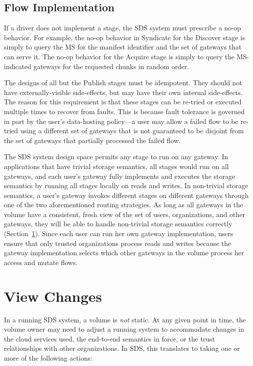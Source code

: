 \subsection{Flow Implementation}

If a driver does not implement a stage, the SDS system must prescribe a
no-op behavior.  For example, the no-op behavior in Syndicate for the
Discover stage is simply to query the MS for the manifest identifier and the 
set of gateways that can serve it.  The no-op behavior for the Acquire
stage is simply to query the MS-indicated gateways for the requested chunks
in random order.

The designs of all but the Publish stages must be
idempotent.  They should not have externally-visible side-effects, but may have
their own internal side-effects.  The reason
for this requirement is that these stages can be re-tried or executed
multiple times to recover from faults.  This is because fault tolerance is
governed in part by the user's data-hosting policy---a user may
allow a failed flow to be re-tried using a different set of gateways that is not
guaranteed to be disjoint from the set of gateways that partially processed
the failed flow.

The SDS system design space permits any stage to run on any gateway.  In
applications that have trivial storage semantics, all stages would run on all
gateways, and each user's gateway fully implements and executes the storage semantics
by running all stages locally on reads and writes.
In non-trivial storage semantics, a user's gateway invokes different stages on
different gateways through one of the two aforementioned routing strategies.
As long as all gateways in the volume have a consistent, fresh view of the set
of users, organizations, and other gateways, they will be able to handle
non-trivial storage semantics correctly (Section~\ref{sec:view-changes}).
Since each user can run her own gateway implementation, users ensure that
only trusted organizations process reads and writes because the gateway
implementation selects which other gateways in the volume process her access and
mutate flows.

\section{View Changes}
\label{sec:view-changes}

In a running SDS system, a volume is \emph{not} static.  At any given point in
time, the volume owner may need to adjust a running system to accommodate changes
in the cloud services used, the end-to-end semantics in force, or the trust
relationships with other organizations.  In SDS, this translates
to taking one or more of the following actions:

